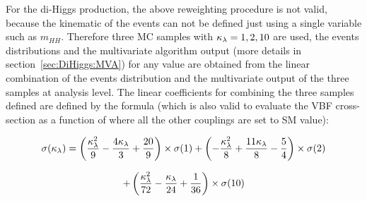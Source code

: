 For the \VBFH di-Higgs production, the above reweighting procedure is not valid, 
because the kinematic of the events can not be defined just using a single variable such as $m_{HH}$. 
Therefore three MC samples with $\kappa_{\lambda} = 1,2,10$ are used, 
the events distributions and the multivariate algorithm output 
(more details in section~\ref{sec:DiHiggs:MVA}) 
for any \kl value are obtained from the linear combination 
of the events distribution and the multivariate output 
of the three samples at analysis level. 
The linear coefficients for combining the three samples defined are defined by the formula 
(which is also valid to evaluate the VBF cross-section as a function of \kl where all the other couplings are set to SM value):

\begin{eqnarray*}
    \sigma (\kappa_{\lambda}) =\left(\frac{\kappa_{\lambda}^{2}}{9} - \frac{4\kappa_{\lambda}}{3} + \frac{20}{9} \right) \times \sigma (1) + \left(-\frac{\kappa_{\lambda}^{2}}{8} + \frac{11\kappa_{\lambda}}{8} - \frac{5}{4} \right) \times \sigma (2)
\end{eqnarray*}
    
\begin{eqnarray}
      + \left(\frac{\kappa_{\lambda}^{2}}{72} - \frac{\kappa_{\lambda}}{24} + \frac{1}{36} \right) \times \sigma (10) 
    \label{eqn:vbf-linear-comb}
\end{eqnarray}
 
